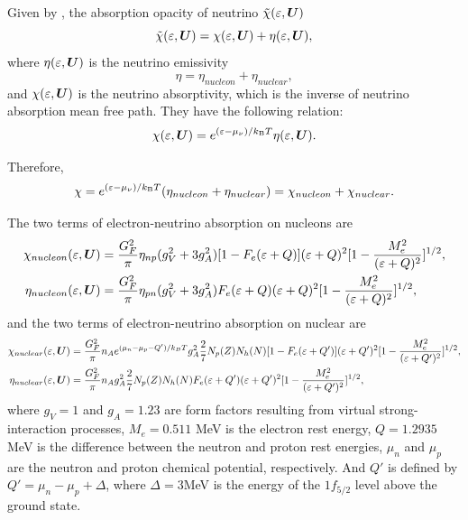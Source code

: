 \documentclass[10pt,preprint]{aastex}
\begin{document}
Given by \citet{bruenn_1985}, the absorption opacity of neutrino $\tilde{\chi}(\varepsilon,\boldsymbol{U})$ 
\begin{equation}
\tilde{\chi}(\varepsilon,\boldsymbol{U}) = \chi(\varepsilon,\boldsymbol{U}) + \eta(\varepsilon,\boldsymbol{U}), 
\end{equation}
where $\eta(\varepsilon,\boldsymbol{U}) $ is the neutrino emissivity
\begin{equation}
\eta = \eta_{nucleon} + \eta_{nuclear},
\end{equation}  
and $ \chi(\varepsilon,\boldsymbol{U})$ is the neutrino absorptivity, which is the inverse of neutrino absorption mean free path.
They have the following relation:
\begin{equation}
\chi(\varepsilon,\boldsymbol{U}) = e^{(\varepsilon-\mu_{\nu})/k_{\mbox{\tiny B}}T} \eta(\varepsilon,\boldsymbol{U}). 
\end{equation}

Therefore,
\begin{equation}
\chi = e^{(\varepsilon-\mu_{\nu})/k_{\mbox{\tiny B}}T} (\eta_{nucleon} + \eta_{nuclear} ) = \chi_{nucleon} + \chi_{nuclear}.
\end{equation}

The two terms of electron-neutrino absorption on nucleons are
\begin{align}
\chi_{nucleon}(\varepsilon,\boldsymbol{U}) & = \dfrac{G^2_F}{\pi} \eta_{np}(g_V^2+3g_A^2)[1-F_e(\varepsilon+Q)](\varepsilon+Q)^2[1-\dfrac{M^2_e}{(\varepsilon+Q)^2}]^{1/2} \label{eq:nucleonabsorption} ,\\
\eta_{nucleon}(\varepsilon,\boldsymbol{U}) &= \dfrac{G^2_F}{\pi}\eta_{pn}(g_V^2+3g_A^2)F_e(\varepsilon+Q)(\varepsilon+Q)^2[1-\dfrac{M^2_e}{(\varepsilon+Q)^2}]^{1/2} \label{eq:nucleonemissivity} ,
\end{align}
and the two terms of electron-neutrino absorption on nuclear are
\begin{align}
\chi_{nuclear}(\varepsilon,\boldsymbol{U}) & = \dfrac{G^2_F}{\pi} n_A e^{(\mu_n -\mu_p -Q')/k_B T} g^2_A \dfrac{2}{7} N_p(Z) N_h(N)[1-F_e(\varepsilon+Q')](\varepsilon+Q')^2[1-\dfrac{M_e^2}{(\varepsilon+Q')^2}]^{1/2} \label{eq:nuclearabsorption} ,\\
\eta_{nuclear}(\varepsilon,\boldsymbol{U}) &=\dfrac{G^2_F}{\pi} n_A g^2_A \dfrac{2}{7} N_p(Z) N_h(N)F_e(\varepsilon+Q')(\varepsilon+Q')^2[1-\dfrac{M_e^2}{(\varepsilon+Q')^2}]^{1/2} \label{eq:nuclearemissivity},
\end{align} 
where $g_V = 1$ and $g_A =1.23$ are form factors resulting from virtual strong-interaction processes, $M_e = 0.511$ MeV is the electron rest energy, $Q = 1.2935$ MeV is the difference between the neutron and proton rest energies, $\mu_n$ and $\mu_p$ are the neutron and proton chemical potential, respectively. And $Q'$ is defined by $Q' = \mu_n -\mu_p + \Delta$, where $\Delta=3$MeV is the energy of the $1f_{5/2}$ level above the ground state.  
\end{document}
